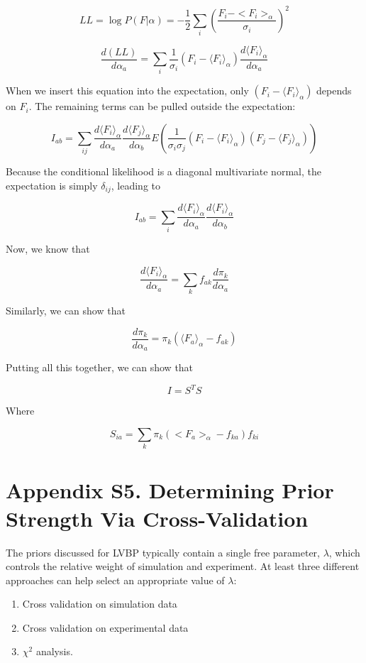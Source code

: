 \documentclass[journal=jacsat,manuscript=article]{achemso}
\begin{document}
$$LL = \log P(F|\alpha) = - \frac{1}{2}\sum_i (\frac{F_i - <F_i>_\alpha}{\sigma_i})^2$$

$$\frac{d(LL)}{d\alpha_a} = \sum_i \frac{1}{\sigma_i}(F_i - \langle F_i \rangle_\alpha) \frac{d\langle F_i \rangle_\alpha}{d\alpha_a}$$

When we insert this equation into the expectation, only $(F_i - \langle F_i \rangle_\alpha)$ depends on $F_i$.  The remaining terms can be pulled outside the expectation:

$$I_{ab} = \sum_{ij} \frac{d\langle F_i \rangle_\alpha}{d\alpha_a} \frac{d\langle F_j \rangle_\alpha}{d\alpha_b} E(\frac{1}{\sigma_i \sigma_j}(F_i - \langle F_i \rangle_\alpha)(F_j - \langle F_j \rangle_\alpha))$$

Because the conditional likelihood is a diagonal multivariate normal, the expectation is simply $\delta_{ij}$, leading to 

$$I_{ab} = \sum_{i} \frac{d\langle F_i \rangle_\alpha}{d\alpha_a} \frac{d\langle F_i \rangle_\alpha}{d\alpha_b} $$

Now, we know that 

$$\frac{d\langle F_i \rangle_\alpha}{d\alpha_a} = \sum_k f_{ak} \frac{d\pi_k}{d\alpha_a}$$

Similarly, we can show that

$$\frac{d\pi_k}{d\alpha_a} = \pi_k (\langle F_a \rangle_{\alpha} - f_{ak})$$


Putting all this together, we can show that

$$I = S^T S$$

Where 

$$S_{ia} = \sum_k \pi_k (<F_a>_\alpha - f_{ka}) f_{ki}$$

\section{Appendix S5.  Determining Prior Strength Via Cross-Validation}

The priors discussed for LVBP typically contain a single free parameter, $\lambda$, which controls the relative weight of simulation and experiment.  At least three different approaches can help select an appropriate value of $\lambda$:

\begin{enumerate}
 \item Cross validation on simulation data
 \item Cross validation on experimental data
 \item $\chi^2$ analysis.  
\end{enumerate}
\end{document}
